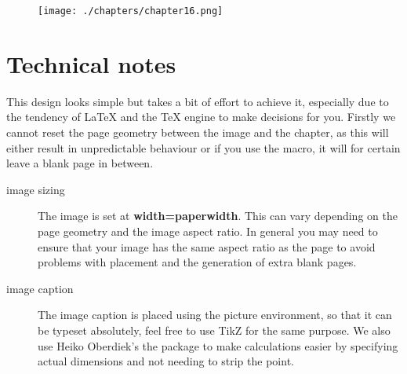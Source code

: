 \medskip

\begin{figure}[ht]
\centering
\texttt{[image: ./chapters/chapter16.png]}
\end{figure}
\lipsum[2]


\section{Technical notes}

This design looks simple but takes a bit of effort to achieve it, especially due to the tendency of LaTeX and the TeX engine to make decisions for you. Firstly we cannot reset the page geometry between the image and the chapter, as this will either result in unpredictable behaviour or if you use the  macro, it will for certain leave a blank page in between.

\begin{description}
\item [image sizing] The image is set at \textbf{width=paperwidth}. This can vary depending on the page geometry and the image aspect ratio. In general you may need to ensure that your image has the same aspect ratio as the page to avoid problems with placement and the generation of extra blank pages.
\item [image caption] The image caption is placed using the picture environment, so that it can be typeset absolutely, feel free to use TikZ for the same purpose. We also use Heiko Oberdiek's the  package to make calculations easier by specifying actual dimensions and not needing to strip the point.
\end{description}



\restoregeometry

